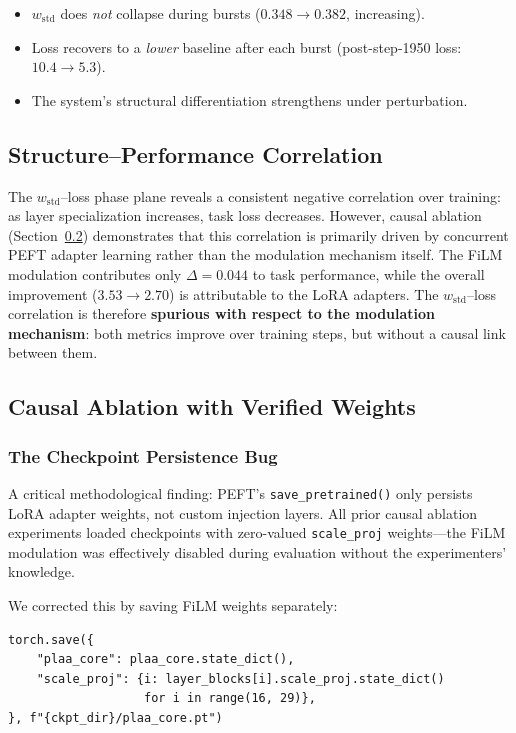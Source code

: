 \documentclass[11pt,a4paper]{article}
\begin{document}
\begin{itemize}
  \item $w_{\mathrm{std}}$ does \emph{not} collapse during bursts
    ($0.348 \to 0.382$, increasing).
  \item Loss recovers to a \emph{lower} baseline after each burst
    (post-step-1950 loss: $10.4 \to 5.3$).
  \item The system's structural differentiation strengthens under perturbation.
\end{itemize}

\subsection{Structure--Performance Correlation}

The $w_{\mathrm{std}}$--loss phase plane reveals a consistent negative correlation
over training: as layer specialization increases, task loss decreases. However,
causal ablation (Section~\ref{sec:causal}) demonstrates that this correlation is
primarily driven by concurrent PEFT adapter learning rather than the modulation
mechanism itself. The FiLM modulation contributes only $\Delta = 0.044$ to task
performance, while the overall improvement ($3.53 \to 2.70$) is attributable to the
LoRA adapters. The $w_{\mathrm{std}}$--loss correlation is therefore
\textbf{spurious with respect to the modulation mechanism}: both metrics improve
over training steps, but without a causal link between them.

\subsection{Causal Ablation with Verified Weights}
\label{sec:causal}

\subsubsection*{The Checkpoint Persistence Bug}
\label{sec:checkpoint_bug}

A critical methodological finding: PEFT's \texttt{save\_pretrained()} only persists
LoRA adapter weights, not custom injection layers. All prior causal ablation
experiments loaded checkpoints with zero-valued \texttt{scale\_proj} weights---the
FiLM modulation was effectively disabled during evaluation without the experimenters'
knowledge.

We corrected this by saving FiLM weights separately:
\begin{lstlisting}
torch.save({
    "plaa_core": plaa_core.state_dict(),
    "scale_proj": {i: layer_blocks[i].scale_proj.state_dict()
                   for i in range(16, 29)},
}, f"{ckpt_dir}/plaa_core.pt")
\end{lstlisting}
\end{document}
